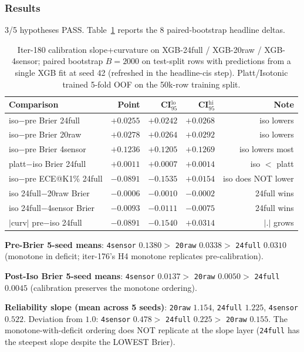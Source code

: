 \subsubsection{Results}\label{sec:p8-iter180-results}

3/5 hypotheses PASS. Table~\ref{tab:p8-iter180-headline} reports the
8 paired-bootstrap headline deltas.

\begin{table}[h]
\centering\small
\caption{Iter-180 calibration slope+curvature on XGB-24full /
XGB-20raw / XGB-4sensor; paired bootstrap $B{=}2000$ on test-split
rows with predictions from a single XGB fit at seed 42 (refreshed
in the headline-cis step). Platt/Isotonic trained 5-fold OOF on the
50k-row training split.}
\label{tab:p8-iter180-headline}
\begin{tabular}{lrrrr}
\hline
Comparison & Point & CI$_{95}^{\mathrm{lo}}$ & CI$_{95}^{\mathrm{hi}}$ & Note \\
\hline
iso$-$pre Brier 24full & $+0.0255$ & $+0.0242$ & $+0.0268$ & iso lowers \\
iso$-$pre Brier 20raw  & $+0.0278$ & $+0.0264$ & $+0.0292$ & iso lowers \\
iso$-$pre Brier 4sensor & $+0.1236$ & $+0.1205$ & $+0.1269$ & iso lowers most \\
platt$-$iso Brier 24full & $+0.0011$ & $+0.0007$ & $+0.0014$ & iso $<$ platt \\
iso$-$pre ECE@K1\% 24full & $-0.0891$ & $-0.1535$ & $+0.0154$ & iso does NOT lower \\
iso 24full$-$20raw Brier & $-0.0006$ & $-0.0010$ & $-0.0002$ & 24full wins \\
iso 24full$-$4sensor Brier & $-0.0093$ & $-0.0111$ & $-0.0075$ & 24full wins \\
$|$curv$|$ pre$-$iso 24full & $-0.0891$ & $-0.1540$ & $+0.0314$ & $|.|$ grows \\
\hline
\end{tabular}
\end{table}

\textbf{Pre-Brier 5-seed means}: \texttt{4sensor} $0.1380 >$
\texttt{20raw} $0.0338 >$ \texttt{24full} $0.0310$ (monotone in
deficit; iter-176's H4 monotone replicates pre-calibration).

\textbf{Post-Iso Brier 5-seed means}: \texttt{4sensor} $0.0137 >$
\texttt{20raw} $0.0050 >$ \texttt{24full} $0.0045$ (calibration
preserves the monotone ordering).

\textbf{Reliability slope (mean across 5 seeds)}: \texttt{20raw}
$1.154$, \texttt{24full} $1.225$, \texttt{4sensor} $0.522$.
Deviation from $1.0$: \texttt{4sensor} $0.478 >$ \texttt{24full}
$0.225 >$ \texttt{20raw} $0.155$. The monotone-with-deficit
ordering does NOT replicate at the slope layer (\texttt{24full} has
the steepest slope despite the LOWEST Brier).

